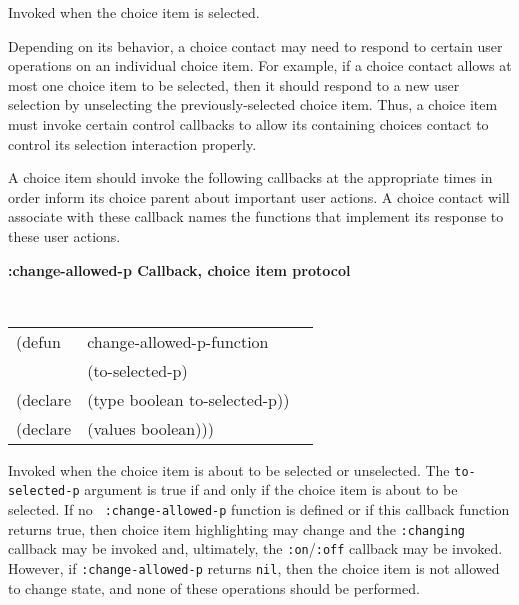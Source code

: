 \begin{flushright} \parbox[t]{6.125in}{
Invoked when the choice item is selected.

}\end{flushright}


Depending on its behavior, a choice contact may need to respond to
certain user operations on an individual choice item. For example, if a choice
contact allows at most one choice item to be selected, then it should respond to
a new user selection by unselecting the previously-selected choice item. Thus, a
choice item must invoke certain control callbacks to allow its containing
choices contact to control its selection interaction properly.

A choice item should invoke the following callbacks at the appropriate times in
order inform its choice parent about important user actions.  A choice contact
will associate with these callback names the functions that implement its
response to these user actions.

{\samepage
{\large {\bf :change-allowed-p \hfill Callback, choice item protocol}} 
\begin{flushright} 
\parbox[t]{6.125in}{
\tt
\begin{tabular}{lll}
\raggedright
(defun & change-allowed-p-function \\
& (to-selected-p)\\
(declare & (type boolean to-selected-p))\\
(declare & (values boolean)))
\end{tabular}
\rm

}\end{flushright}}

\begin{flushright} \parbox[t]{6.125in}{
Invoked when the choice item is about to be selected or unselected. The {\tt to-selected-p}
argument is true if and only if the choice item is about to be selected. If no
{\tt
:change-allowed-p} function is defined or if this  callback function  returns
true, then choice item highlighting may change and the
{\tt :changing} callback may be invoked and, ultimately, the {\tt :on}/{\tt :off}
callback may be invoked. However, if {\tt :change-allowed-p} returns {\tt nil},
then the choice item is not allowed to change state, and none of these operations
should be performed.

}\end{flushright}



